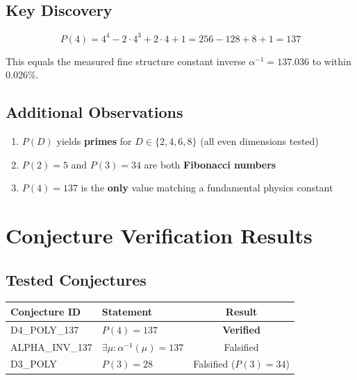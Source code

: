 \documentclass[11pt,a4paper]{article}
\begin{document}
\subsection{Key Discovery}

\begin{equation}
\boxed{P(4) = 4^4 - 2 \cdot 4^3 + 2 \cdot 4 + 1 = 256 - 128 + 8 + 1 = 137}
\end{equation}

This equals the measured fine structure constant inverse $\alpha^{-1} = 137.036$ to within 0.026\%.

\subsection{Additional Observations}

\begin{enumerate}
    \item $P(D)$ yields \textbf{primes} for $D \in \{2, 4, 6, 8\}$ (all even dimensions tested)
    \item $P(2) = 5$ and $P(3) = 34$ are both \textbf{Fibonacci numbers}
    \item $P(4) = 137$ is the \textbf{only} value matching a fundamental physics constant
\end{enumerate}

\section{Conjecture Verification Results}

\subsection{Tested Conjectures}

\begin{center}
\begin{tabular}{|l|l|c|}
\hline
Conjecture ID & Statement & Result \\
\hline
D4\_POLY\_137 & $P(4) = 137$ & \textbf{Verified} \\
ALPHA\_INV\_137 & $\exists \mu: \alpha^{-1}(\mu) = 137$ & Falsified \\
D3\_POLY & $P(3) = 28$ & Falsified ($P(3) = 34$) \\
\hline
\end{tabular}
\end{center}
\end{document}
